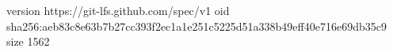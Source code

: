 version https://git-lfs.github.com/spec/v1
oid sha256:aeb83c8e63b7b27cc393f2ec1a1e251c5225d51a338b49eff40e716e69db35c9
size 1562
